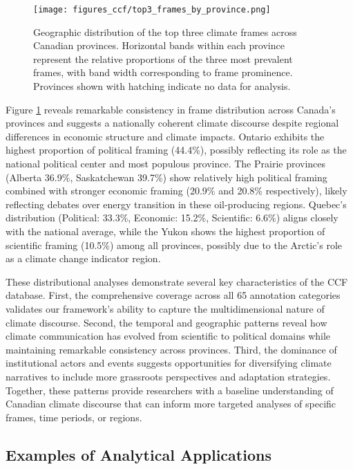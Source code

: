 \documentclass[12pt]{article}
\begin{document}
\begin{figure}[b!]
\centering
\texttt{[image: figures\_ccf/top3\_frames\_by\_province.png]}
\caption{Geographic distribution of the top three climate frames across Canadian provinces. Horizontal bands within each province represent the relative proportions of the three most prevalent frames, with band width corresponding to frame prominence. Provinces shown with hatching indicate no data for analysis.}
\label{fig:provincial_frames}
\end{figure}

Figure \ref{fig:provincial_frames} reveals remarkable consistency in frame distribution across Canada's provinces and suggests a nationally coherent climate discourse despite regional differences in economic structure and climate impacts. Ontario exhibits the highest proportion of political framing (44.4\%), possibly reflecting its role as the national political center and most populous province. The Prairie provinces (Alberta 36.9\%, Saskatchewan 39.7\%) show relatively high political framing combined with stronger economic framing (20.9\% and 20.8\% respectively), likely reflecting debates over energy transition in these oil-producing regions. Quebec's distribution (Political: 33.3\%, Economic: 15.2\%, Scientific: 6.6\%) aligns closely with the national average, while the Yukon shows the highest proportion of scientific framing (10.5\%) among all provinces, possibly due to the Arctic's role as a climate change indicator region. 

These distributional analyses demonstrate several key characteristics of the CCF database. First, the comprehensive coverage across all 65 annotation categories validates our framework's ability to capture the multidimensional nature of climate discourse. Second, the temporal and geographic patterns reveal how climate communication has evolved from scientific to political domains while maintaining remarkable consistency across provinces. Third, the dominance of institutional actors and events suggests opportunities for diversifying climate narratives to include more grassroots perspectives and adaptation strategies. Together, these patterns provide researchers with a baseline understanding of Canadian climate discourse that can inform more targeted analyses of specific frames, time periods, or regions.

\subsection{Examples of Analytical Applications}
\end{document}
